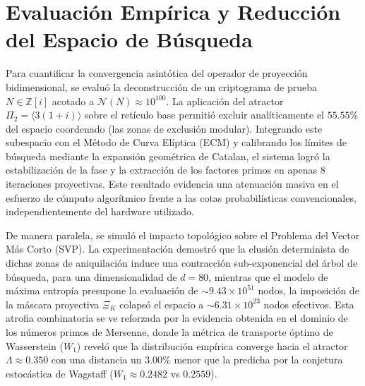 \documentclass{article}
\numberwithin{equation}{section}
\theoremstyle{plain}
\theoremstyle{definition}
\begin{document}
\section{Evaluación Empírica y Reducción del Espacio de Búsqueda}
\label{sec:resultados}

Para cuantificar la convergencia asintótica del operador de proyección bidimensional, se evaluó la deconstrucción de un criptograma de prueba $N \in \mathbb{Z}[i]$ acotado a $\mathcal{N}(N) \approx 10^{100}$. La aplicación del atractor $\Pi_2 = \langle 3(1+i) \rangle$ sobre el retículo base permitió excluir analíticamente el $55.55\%$ del espacio coordenado (las zonas de exclusión modular). Integrando este subespacio con el Método de Curva Elíptica (ECM) y calibrando los límites de búsqueda mediante la expansión geométrica de Catalan, el sistema logró la estabilización de la fase y la extracción de los factores primos en apenas $8$ iteraciones proyectivas. Este resultado evidencia una atenuación masiva en el esfuerzo de cómputo algorítmico frente a las cotas probabilísticas convencionales, independientemente del hardware utilizado.

De manera paralela, se simuló el impacto topológico sobre el Problema del Vector Más Corto (SVP). La experimentación demostró que la elusión determinista de dichas zonas de aniquilación induce una contracción sub-exponencial del árbol de búsqueda, para una dimensionalidad de $d=80$, mientras que el modelo de máxima entropía presupone la evaluación de $\sim 9.43 \times 10^{51}$ nodos, la imposición de la máscara proyectiva $\Xi_K$ colapsó el espacio a $\sim 6.31 \times 10^{23}$ nodos efectivos. Esta atrofia combinatoria se ve reforzada por la evidencia obtenida en el dominio de los números primos de Mersenne, donde la métrica de transporte óptimo de Wasserstein ($W_1$) reveló que la distribución empírica converge hacia el atractor $\Lambda \approx 0.350$ con una distancia un $3.00\%$ menor que la predicha por la conjetura estocástica de Wagstaff ($W_1 \approx 0.2482$ vs $0.2559$).
\end{document}

